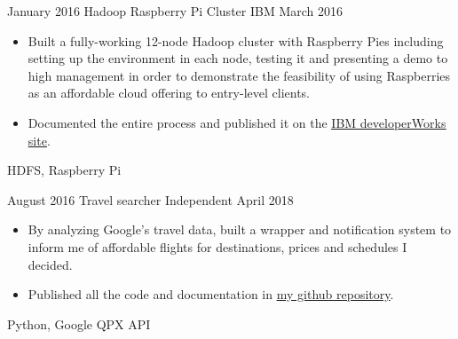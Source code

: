 \begin{projects}
    \emptySeparator

    \project
        {January 2016}
        {Hadoop Raspberry Pi Cluster}
        {IBM}
        {March 2016}
        {
            \begin{itemize}
                \item Built a fully-working 12-node Hadoop cluster with 
                    Raspberry Pies including setting up the environment in each 
                    node, testing it and presenting a demo to high management 
                    in order to demonstrate the feasibility of using 
                    Raspberries as an affordable cloud offering to entry-level 
                    clients.
                \item Documented the entire process and published it on the 
                    \href{https://developer.ibm.com/recipes/tutorials/building-a-hadoop-cluster-with-raspberry-pi/}
                    {\underline{IBM developerWorks site}}.
            \end{itemize}
        }
        {
            HDFS,
            Raspberry Pi
        }

    \emptySeparator

    \project
        {August 2016}
        {Travel searcher}
        {Independent}
        {April 2018}
        {
            \begin{itemize}
                \item By analyzing Google's travel data, built a wrapper and 
                    notification system to inform me of affordable flights for 
                    destinations, prices and schedules I decided.
                \item Published all the code and documentation in 
                    \href{https://github.com/alanverdugo/QPX}{\underline{my 
                    github repository}}.
            \end{itemize}
        }
        {
            Python,
            Google QPX API
        }

\end{projects}
